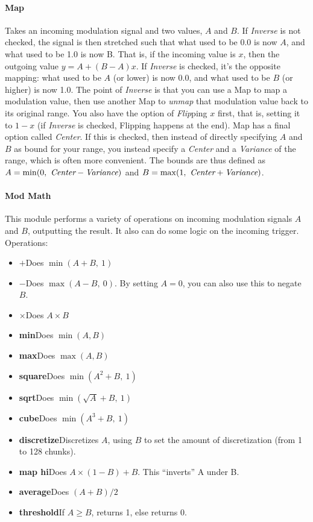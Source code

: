 \documentclass{article}
\begin{document}
\paragraph{Map}  Takes an incoming modulation signal and two values, \(A\) and \(B\).  If {\it Inverse} is not checked, the signal is then stretched such that what used to be 0.0 is now \(A\), and what used to be 1.0 is now B.  That is, if the incoming value is \(x\), then the outgoing value \(y = A + (B - A)x\).  If {\it Inverse} is checked, it's the opposite mapping: what used to be \(A\) (or lower) is now 0.0, and what used to be \(B\) (or higher) is now 1.0.  The point of {\it Inverse} is that you can use a Map to map a modulation value, then use another Map to {\it unmap} that modulation value back to its original range.  You also have the option of {\it Flip}ping \(x\) first, that is, setting it to \(1-x\) (if {\it Inverse} is checked, Flipping happens at the end).  Map has a final option called {\it Center}.  If this is checked, then instead of directly specifying \(A\) and \(B\) as bound for your range, you instead specify a {\it Center} and a {\it Variance} of the range, which is often more convenient.  The bounds are thus defined as \(A = \min(0,\ \text{\it Center} - \text{\it Variance})\) and \(B = \max(1,\ \text{\it Center} + \text{\it Variance})\).

\paragraph{Mod Math}  This module performs a variety of operations on incoming modulation signals \(A\) and \(B\), outputting the result.  It also can do some logic on the incoming trigger.  Operations:

\begin{itemize}
\item \(\boldsymbol{+}\)\quad Does \(\min(A + B,\ 1)\)
\item \(\boldsymbol -\)\quad Does \(\max(A - B,\ 0)\).  By setting \(A=0\), you can also use this to negate \(B\).
\item \(\boldsymbol \times\)\quad Does \(A \times B\)
\item {\bf min}\quad Does \(\min(A, B)\)
\item {\bf max}\quad Does \(\max(A, B)\)
\item {\bf square}\quad Does \(\min(A^2 + B,\ 1)\)
\item {\bf sqrt}\quad Does \(\min(\sqrt{A} + B,\ 1)\)
\item {\bf cube}\quad Does \(\min(A^3 + B,\ 1)\)
\item {\bf discretize}\quad Discretizes \(A\), using \(B\) to set the amount of discretization (from 1 to 128 chunks).
\item {\bf map hi}\quad Does \(A \times (1-B) + B\).  This ``inverts'' A under B.
\item {\bf average}\quad Does \((A + B) / 2\)
\item {\bf threshold}\quad If \(A \geq B\), returns 1, else returns 0.
\end{itemize}
\end{document}
